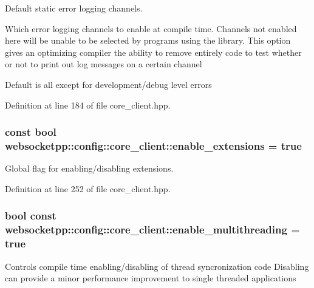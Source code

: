 Default static error logging channels. 

Which error logging channels to enable at compile time. Channels not enabled here will be unable to be selected by programs using the library. This option gives an optimizing compiler the ability to remove entirely code to test whether or not to print out log messages on a certain channel

Default is all except for development/debug level errors 

Definition at line 184 of file core\+\_\+client.\+hpp.

\hypertarget{structwebsocketpp_1_1config_1_1core__client_a21b1a53d292be873c1fffa7222cb3804}{}
\subsubsection[{enable\+\_\+extensions}]{\setlength{\rightskip}{0pt plus 5cm}const bool websocketpp\+::config\+::core\+\_\+client\+::enable\+\_\+extensions = true\hspace{0.3cm}{\ttfamily [static]}}\label{structwebsocketpp_1_1config_1_1core__client_a21b1a53d292be873c1fffa7222cb3804}


Global flag for enabling/disabling extensions. 



Definition at line 252 of file core\+\_\+client.\+hpp.

\hypertarget{structwebsocketpp_1_1config_1_1core__client_a20e354b545c8af8bd55ed076f42cb1d7}{}
\subsubsection[{enable\+\_\+multithreading}]{\setlength{\rightskip}{0pt plus 5cm}bool const websocketpp\+::config\+::core\+\_\+client\+::enable\+\_\+multithreading = true\hspace{0.3cm}{\ttfamily [static]}}\label{structwebsocketpp_1_1config_1_1core__client_a20e354b545c8af8bd55ed076f42cb1d7}
Controls compile time enabling/disabling of thread syncronization code Disabling can provide a minor performance improvement to single threaded applications 

